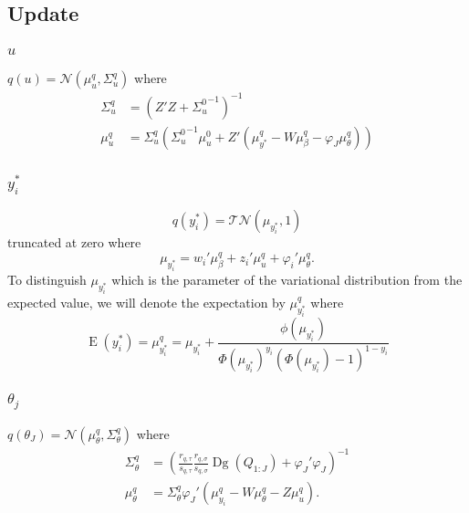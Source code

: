 \documentclass[11pt]{article}
\newcommand{\opn}{\operatorname}
\begin{document}
\subsection{Update}
\subsubsection{$u$}
$q\left(u\right) = \mathcal{N}\left(\mu_{u}^{q}, \Sigma_{u}^{q}\right)$ where
\begin{align*}
  \Sigma_{u}^{q} &= \left(Z'Z+{\Sigma_{u}^{0}}^{-1}\right)^{-1}\\
  \mu_{u}^{q} &= \Sigma_{u}^{q}\left({\Sigma_{u}^{0}}^{-1}\mu_{u}^{0} + Z'\left(\mu_{y^{*}}^{q} - W\mu_{\beta}^{q}-\varphi_{J}\mu_{\theta}^{q}\right)\right)
\end{align*}
\subsubsection{$y_{i}^{*}$}
\begin{equation*}
  q\left(y_{i}^{*}\right) = \mathcal{TN}\left(\mu_{y_{i}^{*}}, 1\right)
\end{equation*}
truncated at zero where
\begin{equation*}
  \mu_{y_{i}^{*}} = w_{i}'\mu_{\beta}^{q} + z_{i}'\mu_{u}^{q} + \varphi_{i}'\mu_{\theta}^{q}.
\end{equation*}
To distinguish $\mu_{y_{i}^{*}}$ which is the parameter of the variational distribution from the expected value, we will denote the expectation by $\mu_{y_{i}^{*}}^{q}$ where
\begin{equation*}
  \opn{E}\left(y_{i}^{*}\right) = \mu_{y_{i}^{*}}^{q} = \mu_{y_{i}^{*}} + \frac{\phi\left(\mu_{y_{i}^{*}}\right)}{\Phi\left(\mu_{y_{i}^{*}}\right)^{y_{i}}\left(\Phi\left(\mu_{y_{i}^{*}}\right)-1\right)^{1-y_{i}}}
\end{equation*}
\subsubsection{$\theta_{j}$}
$q\left(\theta_{J}\right) = \mathcal{N}\left(\mu_{\theta}^{q}, \Sigma_{\theta}^{q}\right)$ where
\begin{align*}
  \Sigma_{\theta}^{q} &= \left(\frac{r_{q,\tau}}{s_{q,\tau}}\frac{r_{q,\sigma}}{s_{q,\sigma}}\opn{Dg}\left(Q_{1:J}\right) + \varphi_{J}'\varphi_{J}\right)^{-1}\\
  \mu_{\theta}^{q} &= \Sigma_{\theta}^{q}\varphi_{J}'\left(\mu_{y_{i}}^{q} - W\mu_{\theta}^{q}-Z\mu_{u}^{q}\right).
\end{align*}
\end{document}
